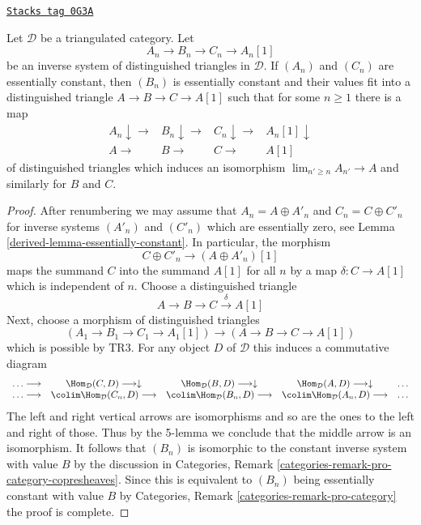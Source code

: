 \begin{lemma}
\label{derived-lemma-essentially-constant-2-out-of-3}
\href{https://stacks.math.columbia.edu/tag/0G3A}{\texttt{Stacks tag 0G3A}}

Let $\mathcal{D}$ be a triangulated category. Let
$$
A_n \to B_n \to C_n \to A_n[1]
$$
be an inverse system of distinguished triangles in $\mathcal{D}$.
If $(A_n)$ and $(C_n)$ are essentially constant, then
$(B_n)$ is essentially constant and their values fit into
a distinguished triangle $A \to B \to C \to A[1]$ such that for
some $n \geq 1$ there is a map
$$
\begin{array}{cccc}A_n \downarrow\longrightarrow & B_n \downarrow\longrightarrow & C_n \downarrow\longrightarrow & A_n[1] \downarrow \\ A \longrightarrow & B \longrightarrow & C \longrightarrow & A[1]\end{array}
$$
of distinguished triangles which induces an isomorphism
$\lim_{n' \geq n} A_{n'} \to A$ and similarly for $B$ and $C$.
\end{lemma}

\begin{proof}

After renumbering we may assume that $A_n = A \oplus A'_n$ and
$C_n = C \oplus C'_n$ for inverse systems $(A'_n)$ and $(C'_n)$
which are essentially zero, see Lemma \ref{derived-lemma-essentially-constant}.
In particular, the morphism
$$
C \oplus C'_n \to (A \oplus A'_n)[1]
$$
maps the summand $C$ into the summand $A[1]$ for all $n$ by a map
$\delta : C \to A[1]$ which is independent of $n$. Choose a distinguished
triangle
$$
A \to B \to C \xrightarrow{\delta} A[1]
$$
Next, choose a morphism of distinguished triangles
$$
(A_1 \to B_1 \to C_1 \to A_1[1]) \to
(A \to B \to C \to A[1])
$$
which is possible by TR3. For any object $D$ of $\mathcal{D}$ this induces
a commutative diagram
$$
\begin{array}{ccccc}\ldots \longrightarrow & \Hom_\mathcal{D}(C, D) \longrightarrow\downarrow & \Hom_\mathcal{D}(B, D) \longrightarrow\downarrow & \Hom_\mathcal{D}(A, D) \longrightarrow\downarrow & \ldots \\ \ldots \longrightarrow & \colim \Hom_\mathcal{D}(C_n, D) \longrightarrow & \colim \Hom_\mathcal{D}(B_n, D) \longrightarrow & \colim \Hom_\mathcal{D}(A_n, D) \longrightarrow & \ldots\end{array}
$$
The left and right vertical arrows are isomorphisms and so are the ones
to the left and right of those. Thus by the 5-lemma we conclude that
the middle arrow is an isomorphism. It follows that
$(B_n)$ is isomorphic to the constant inverse system with value $B$
by the discussion in
Categories, Remark \ref{categories-remark-pro-category-copresheaves}.
Since this is equivalent to $(B_n)$ being essentially constant
with value $B$ by
Categories, Remark \ref{categories-remark-pro-category}
the proof is complete.
\end{proof}


